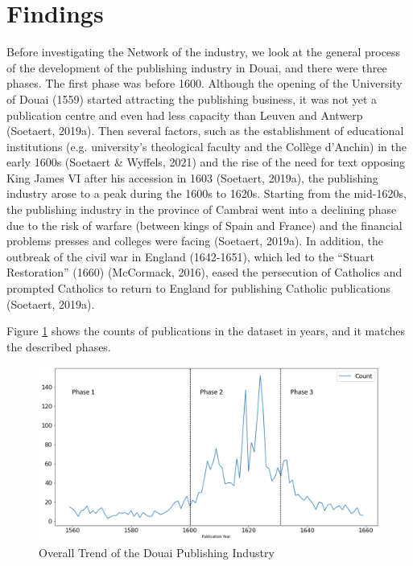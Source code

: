 \documentclass[12pt,a4paper,oneside]{book}
\begin{document}
\begin{sloppypar}
\section{Findings}
Before investigating the Network of the industry, we look at the general process of the development of the publishing industry in Douai, and there were three phases. The first phase was before 1600. Although the opening of the University of Douai (1559) started attracting the publishing business, it was not yet a publication centre and even had less capacity than Leuven and Antwerp (Soetaert, 2019a). Then several factors, such as the establishment of educational institutions (e.g. university’s theological faculty and the Collège d'Anchin) in the early 1600s (Soetaert \& Wyffels, 2021) and the rise of the need for text opposing King James VI after his accession in 1603 (Soetaert, 2019a), the publishing industry arose to a peak during the 1600s to 1620s. Starting from the mid-1620s, the publishing industry in the province of Cambrai went into a declining phase due to the risk of warfare (between kings of Spain and France) and the financial problems presses and colleges were facing (Soetaert, 2019a). In addition, the outbreak of the civil war in England (1642-1651), which led to the “Stuart Restoration” (1660) (McCormack, 2016), eased the persecution of Catholics and prompted Catholics to return to England for publishing Catholic publications (Soetaert, 2019a).

\pagebreak
Figure \ref{fig:overallTrend} shows the counts of publications in the dataset in years, and it matches the described phases.

\begin{figure}[H]
\centering
\includegraphics[scale=0.4]{graph/Overall Trend of the Douai Publishing Industry.png}
\caption{Overall Trend of the Douai Publishing Industry}
\label{fig:overallTrend}
\end{figure}


\end{sloppypar}
\end{document}
